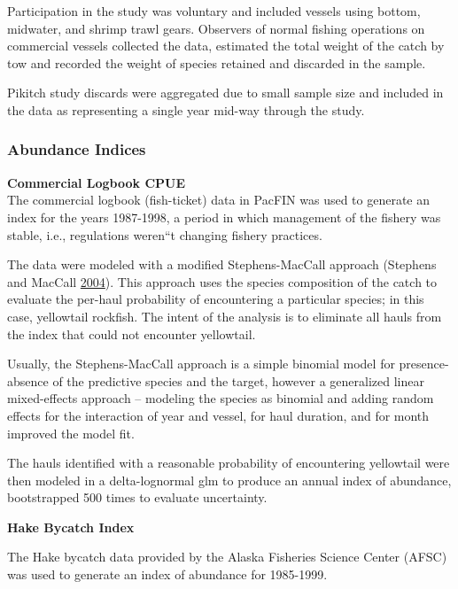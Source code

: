 \documentclass[12pt,]{article}
\begin{document}
Participation in the study was voluntary and included vessels using
bottom, midwater, and shrimp trawl gears. Observers of normal fishing
operations on commercial vessels collected the data, estimated the total
weight of the catch by tow and recorded the weight of species retained
and discarded in the sample.

Pikitch study discards were aggregated due to small sample size and
included in the data as representing a single year mid-way through the
study.

\subsubsection{Abundance Indices}\label{abundance-indices}

\textbf{Commercial Logbook CPUE}\\
The commercial logbook (fish-ticket) data in PacFIN was used to generate
an index for the years 1987-1998, a period in which management of the
fishery was stable, i.e., regulations weren``t changing fishery
practices.

The data were modeled with a modified Stephens-MacCall approach
(Stephens and MacCall \protect\hyperlink{ref-Stephens2004}{2004}). This
approach uses the species composition of the catch to evaluate the
per-haul probability of encountering a particular species; in this case,
yellowtail rockfish. The intent of the analysis is to eliminate all
hauls from the index that could not encounter yellowtail.

Usually, the Stephens-MacCall approach is a simple binomial model for
presence-absence of the predictive species and the target, however a
generalized linear mixed-effects approach -- modeling the species as
binomial and adding random effects for the interaction of year and
vessel, for haul duration, and for month improved the model fit.

The hauls identified with a reasonable probability of encountering
yellowtail were then modeled in a delta-lognormal glm to produce an
annual index of abundance, bootstrapped 500 times to evaluate
uncertainty.

\textbf{Hake Bycatch Index}

The Hake bycatch data provided by the Alaska Fisheries Science Center
(AFSC) was used to generate an index of abundance for 1985-1999.
\end{document}
